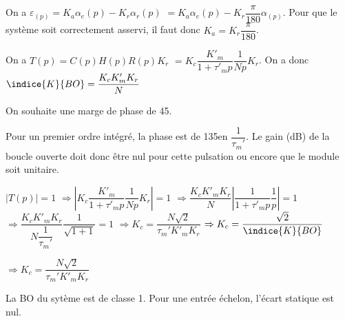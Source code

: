 \ifprof
\begin{corrige}
On a 
$\varepsilon_(p)=K_a \alpha_e(p) - K_r \alpha_r(p) $
$=K_a \alpha_e(p) - K_r \dfrac{\pi}{180}\alpha_(p) $.
Pour que le système soit correctement asservi, il faut donc  $K_a =  K_r \dfrac{\pi}{180}$.
\end{corrige}
\else
\fi


\ifprof
\begin{corrige}
On a $T(p)= C(p)H(p)R(p)K_r$ 
$=K_c \dfrac{K'_m}{1+\tau'_m p}\dfrac{1}{Np} K_r  $. On a donc $\indice{K}{BO}=\dfrac{K_c K'_mK_r}{N} $
\end{corrige}
\else
\fi

On souhaite une marge de phase de 45\degres.

\ifprof
\begin{corrige}
Pour un premier ordre intégré, la phase est de 135\degres en $\dfrac{1}{\tau_m'}$. Le  gain (dB) de la boucle ouverte doit donc être nul pour cette pulsation ou encore que le module soit unitaire.

$|T(p)|=1$ 
$\Rightarrow \left| K_c \dfrac{K'_m}{1+\tau'_m p}\dfrac{1}{Np} K_r \right| = 1$ 
$\Rightarrow \dfrac{K_c K'_m K_r}{N} \left| \dfrac{1}{1+\tau'_m p}\dfrac{1}{p}  \right| = 1$ 
$\Rightarrow \dfrac{K_c K'_m K_r}{N\dfrac{1}{\tau_m'}}  \dfrac{1}{\sqrt{1+1 }}   = 1$ 
$\Rightarrow K_c   = \dfrac{N\sqrt{2}}{\tau_m' K'_m K_r}$ 
$\Rightarrow K_c   = \dfrac{\sqrt{2}}{\indice{K}{BO}}$ 

\end{corrige}
\else
\fi



\ifprof
\begin{corrige}
$\Rightarrow K_c   = \dfrac{N\sqrt{2}}{\tau_m' K'_m K_r}$ 
\end{corrige}
\else
\fi



\ifprof
\begin{corrige}
La BO du sytème est de classe 1. Pour une entrée échelon, l'écart statique est nul. 
\end{corrige}
\else
\fi

